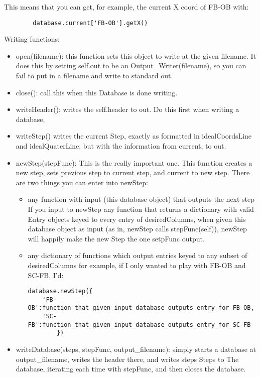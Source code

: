 	This means that you can get, for example, the current X coord of 
	FB-OB with:
	\begin{verbatim}
		database.current['FB-OB'].getX()
	\end{verbatim}
	Writing functions:
\begin{itemize}
\item		open(filename):
			this function sets this object to write at the
			given filename. It does this by setting 
			self.out to be an Output\_Writer(filename), so you 
			can fail to put in a filename and write to 
			standard out.

\item		close():
			call this when this Database is done writing.

\item		writeHeader():
			writes the self.header to out. Do this first when 
			writing a database,

\item		writeStep()
			writes the current Step, exactly as formatted in 
			idealCoordsLine and idealQuaterLine, but with the 
			information from current, to out.


\item		newStep(stepFunc):
			This is the really important one. 
			This function creates a new step, sets previous 
			step to current step, and current to new step.
			There are two things you can enter into newStep:
		\begin{itemize}
			\item	 any function with input (this database
				   object) that outputs the next step
				   If you input to newStep any function 
				   that returns a dictionary with valid
				   Entry objects keyed to every entry of 
				   desiredColumns, when given this database 
				   object as input (as in, newStep calls 
				   stepFunc(self)), newStep will happily 
				   make the new Step the one setpFunc 
				   output. 
	
			\item any dictionary of functions which output entries
			   keyed to any subset of desiredColumns
			   for example, if I only wanted to play with FB-OB
			   and SC-FB, I'd:
\begin{verbatim}
database.newStep({
	'FB-OB':function_that_given_input_database_outputs_entry_for_FB-OB,
	'SC-FB':function_that_given_input_database_outputs_entry_for_SC-FB
		})
\end{verbatim}
		\end{itemize}
	
						 
\item		writeDatabase(steps, stepFunc, output\_filename):
			simply starts a database at output\_filename, writes
			the header there, and writes steps Steps to 
			The database, iterating each time with stepFunc, 
			and then closes the database.
\end{itemize}

